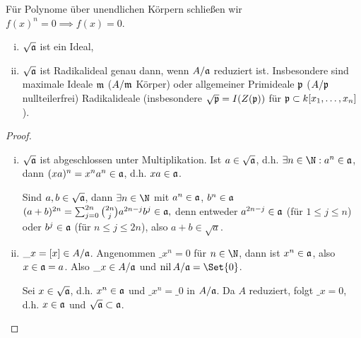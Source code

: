 \begin{ex}
    Für Polynome über unendlichen Körpern schließen wir $f(x)^n = 0 \implies f(x) = 0$.
\end{ex}

\begin{lem}
    \begin{enumerate}[i)]
        \item
            $\sqrt{\mathfrak{a}}$ ist ein Ideal,
        \item
            $\sqrt{\mathfrak{a}}$ ist Radikalideal genau dann, wenn $A / \mathfrak{a}$ reduziert ist.
            Insbesondere sind maximale Ideale $\mathfrak{m}$ ($A / \mathfrak{m}$ Körper) oder allgemeiner Primideale $\mathfrak{p}$ ($A / \mathfrak{p}$ nullteilerfrei) Radikalideale (insbesondere $\sqrt{\mathfrak{p}} = I(Z(\mathfrak{p}))$ für $\mathfrak{p} \subset k[x_1, \dotsc, x_n]$).
    \end{enumerate}
    \begin{proof}
        \begin{enumerate}[i)]
            \item
                $\sqrt{\mathfrak{a}}$ ist abgeschlossen unter Multiplikation.
                Ist $a \in \sqrt{\mathfrak{a}}$, d.h. $\exists n \in \N: a^n \in \frk a$, dann $(xa)^n = x^n a^n \in \mathfrak{a}$, d.h. $x a \in \mathfrak{a}$.

                Sind $a, b \in \sqrt{\mathfrak{a}}$, dann $\exists n \in \N$ mit $a^n \in \mathfrak{a}$, $b^n \in \mathfrak{a}$
                \begin{math}
                    (a + b)^{2n} = \sum_{j=0}^{2n} \binom{2n}{j} a^{2n-j}b^j \in \mathfrak{a},
                \end{math}
                denn entweder $a^{2n - j} \in \mathfrak{a}$ (für $1 \le j \le n$) oder $b^{j} \in \mathfrak{a}$ (für $n \le j \le 2n$),
                also $a + b \in \sqrt{a}$.
            \item
                \begin{seg}{\ProofImplication}
                    $\_ x = [x] \in A / \mathfrak{a}$.
                    Angenommen $\_x^n = 0$ für $n \in \N$, dann ist $x^n \in \mathfrak{a}$, also $x \in \mathfrak{a} = a$.
                    Also $\_x \in A / \mathfrak{a}$ und $\nil A / \frk a = \Set{0}$.
                \end{seg}
                \begin{seg}{\ProofImplication*}
                    Sei $x \in \sqrt{\mathfrak{a}}$, d.h. $x^n \in \mathfrak{a}$ und $\_{x^n} = \_0$ in $A / \mathfrak{a}$.
                    Da $A$ reduziert, folgt $\_x = 0$, d.h. $x \in \mathfrak{a}$ und $\sqrt{\mathfrak{a}} \subset \mathfrak{a}$.
                \end{seg}
        \end{enumerate}
    \end{proof}
\end{lem}

